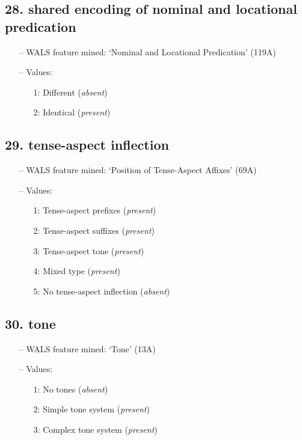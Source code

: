\subsection*{28. shared encoding of nominal and locational predication}

\begin{itemize}
\item[--] WALS feature mined: `Nominal and Locational Predication' (119A)
\item[--] Values:

\begin{enumerate}
\item[1:] Different (\emph{absent})
\item[2:] Identical (\emph{present})
\end{enumerate}
\end{itemize}

\subsection*{29. tense-aspect inflection}

\begin{itemize}
\item[--] WALS feature mined: `Position of Tense-Aspect Affixes' (69A)
\item[--] Values:

\begin{enumerate}
\item[1:] Tense-aspect prefixes (\emph{present})
\item[2:] Tense-aspect suffixes (\emph{present})
\item[3:] Tense-aspect tone (\emph{present})
\item[4:] Mixed type (\emph{present})
\item[5:] No tense-aspect inflection (\emph{absent})
\end{enumerate}
\end{itemize}

\subsection*{30. tone}

\begin{itemize}
\item[--] WALS feature mined: `Tone' (13A)
\item[--] Values:

\begin{enumerate}
\item[1:] No tones (\emph{absent})
\item[2:] Simple tone system (\emph{present})
\item[3:] Complex tone system (\emph{present})
\end{enumerate}
\end{itemize}

